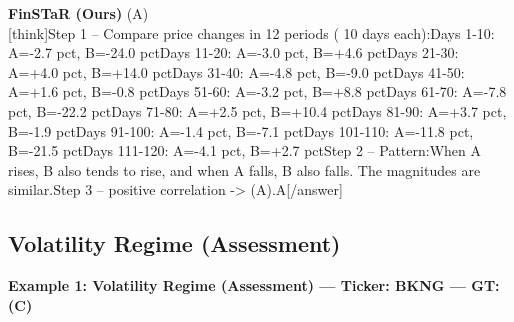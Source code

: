 \begin{minipage}[t]{0.41\textwidth}
\colorbox{green!10}{\parbox{\dimexpr\textwidth-2\fboxsep}{
\textbf{FinSTaR (Ours)} \textcolor{green!50!black}{(A)} \\[2pt]
\tiny
[think]\newline Step 1 -- Compare price changes in 12 periods ( 10 days each):\newline   Days 1-10: A=-2.7 pct, B=-24.0 pct\newline   Days 11-20: A=-3.0 pct, B=+4.6 pct\newline   Days 21-30: A=+4.0 pct, B=+14.0 pct\newline   Days 31-40: A=-4.8 pct, B=-9.0 pct\newline   Days 41-50: A=+1.6 pct, B=-0.8 pct\newline   Days 51-60: A=-3.2 pct, B=+8.8 pct\newline   Days 61-70: A=-7.8 pct, B=-22.2 pct\newline   Days 71-80: A=+2.5 pct, B=+10.4 pct\newline   Days 81-90: A=+3.7 pct, B=-1.9 pct\newline   Days 91-100: A=-1.4 pct, B=-7.1 pct\newline   Days 101-110: A=-11.8 pct, B=-21.5 pct\newline   Days 111-120: A=-4.1 pct, B=+2.7 pct\newline Step 2 -- Pattern:\newline When A rises, B also tends to rise, and when A falls, B also falls. The magnitudes are similar.\newline Step 3 -- positive correlation -> (A).\newline [/think]\newline [answer]A[/answer]
}}
\vspace{-30pt}
\end{minipage}

\clearpage
\subsection{Volatility Regime (Assessment)}


\noindent
\textbf{Example 1: Volatility Regime (Assessment) --- Ticker: BKNG --- GT: (C)}
\vspace{2pt}

